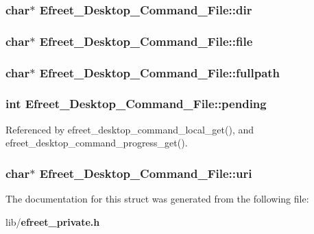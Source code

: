 \subsubsection[dir]{\setlength{\rightskip}{0pt plus 5cm}char$\ast$ {\bf Efreet\_\-Desktop\_\-Command\_\-File::dir}}\label{structEfreet__Desktop__Command__File_6642b6f9e1726c130e571a6ee8d7cb36}


\subsubsection[file]{\setlength{\rightskip}{0pt plus 5cm}char$\ast$ {\bf Efreet\_\-Desktop\_\-Command\_\-File::file}}\label{structEfreet__Desktop__Command__File_0d66f13242e9320282f81dcb418c8ea8}


\subsubsection[fullpath]{\setlength{\rightskip}{0pt plus 5cm}char$\ast$ {\bf Efreet\_\-Desktop\_\-Command\_\-File::fullpath}}\label{structEfreet__Desktop__Command__File_25bc63aa451e5ac835fdda90892f3427}


\subsubsection[pending]{\setlength{\rightskip}{0pt plus 5cm}int {\bf Efreet\_\-Desktop\_\-Command\_\-File::pending}}\label{structEfreet__Desktop__Command__File_e31535c25282b0c377e53617731e8e4c}




Referenced by efreet\_\-desktop\_\-command\_\-local\_\-get(), and efreet\_\-desktop\_\-command\_\-progress\_\-get().
\subsubsection[uri]{\setlength{\rightskip}{0pt plus 5cm}char$\ast$ {\bf Efreet\_\-Desktop\_\-Command\_\-File::uri}}\label{structEfreet__Desktop__Command__File_743107e19271353828f44cccc89c4c88}




The documentation for this struct was generated from the following file:\begin{CompactItemize}
\item 
lib/{\bf efreet\_\-private.h}\end{CompactItemize}
